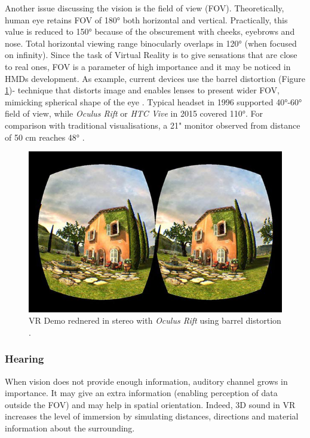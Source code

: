 Another issue discussing the vision is the field of view (FOV). Theoretically, human eye retains FOV of 180° both horizontal and vertical. Practically, this value is reduced to 150° because of the obscurement with cheeks, eyebrows and nose. Total horizontal viewing range binocularly overlaps in 120° (when focused on infinity). Since the task of Virtual Reality is to give sensations that are close to real ones, FOV is a parameter of high importance and it may be noticed in HMDs development. As example, current devices use the barrel distortion (Figure \ref{fig:tuscany})- technique that distorts image and enables lenses to present wider FOV, mimicking spherical shape of the eye \cite{Parisi15}.  Typical headset in 1996 supported 40°-60° field of view, while \textit{Oculus Rift} or \textit{HTC Vive} in 2015 covered 110°. For comparison with traditional visualisations, a 21" monitor observed from distance of 50 cm reaches 48° \cite{Mazuryk96, Oscillada15}.
\begin{figure}[h]
\centering    
\includegraphics[width=1.0\textwidth]{Figs/tuscany.jpg}
\caption{VR Demo rednered in stereo with \textit{Oculus Rift} using barrel distortion \cite{Parisi15}.}
\label{fig:tuscany} 
\end{figure} 

\subsubsection{Hearing}
When vision does not provide enough information, auditory channel grows in importance. It may give an extra information (enabling perception of data outside the FOV) and may help in spatial orientation. Indeed, 3D sound in VR increases the level of immersion by simulating distances, directions and material information about the surrounding.

